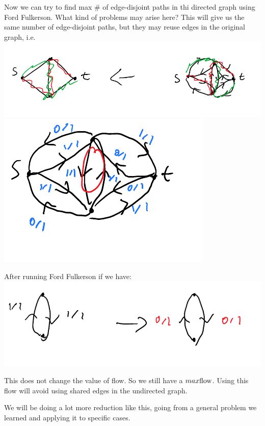 \documentclass[12 pt]{article}
\begin{document}
        Now we can try to find max \# of edge-disjoint paths in thi
        directed graph using Ford Fulkerson. What kind of problems may
        arise here? This will give us the same number of edge-disjoint
        paths, but they may reuse edges in the original graph, i.e.
        \\ \includegraphics[width=.9\textwidth]{i78.pdf}
        \\ \includegraphics[width=.9\textwidth]{i79.pdf}

        After running Ford Fulkerson if we have:
        \\ \includegraphics[width=.9\textwidth]{i80.pdf}
        
        This does not change the value of flow. So we still have a
        $max\hbox{flow}$. Using this flow will avoid using shared
        edges in the undirected graph.

        We will be doing a lot more reduction like this, going from a
        general problem we learned and applying it to specific
        cases.
\end{document}

